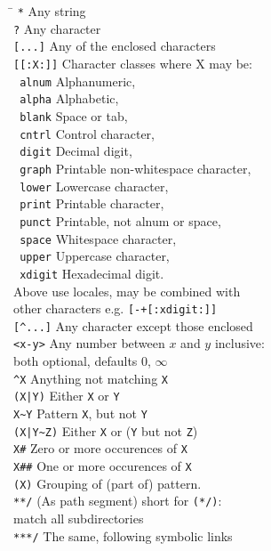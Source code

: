 \documentclass{article}
\begin{document}
\begin{multicols}{3}
\begin{tabbing}
\hskip 40pt \= \kill
\verb!*!       \>  Any string \\
\verb!?!       \>  Any character \\
\verb![...]!   \>  Any of the enclosed characters \\
\verb![[:X:]]! \>  Character classes where X may be: \\
\verb! alnum!  \>  Alphanumeric, \\
\verb! alpha!  \>  Alphabetic, \\
\verb! blank!  \>  Space or tab, \\
\verb! cntrl!  \>  Control character, \\
\verb! digit!  \>  Decimal digit, \\
\verb! graph!  \>  Printable non-whitespace character, \\
\verb! lower!  \>  Lowercase character, \\
\verb! print!  \>  Printable character, \\
\verb! punct!  \>  Printable, not alnum or space, \\
\verb! space!  \>  Whitespace character, \\
\verb! upper!  \>  Uppercase character, \\
\verb! xdigit! \>  Hexadecimal digit. \\
               \>  Above use locales, may be combined with \\
	       \>  other characters e.g. \verb![-+[:xdigit:]]! \\
\verb![^...]!  \>  Any character except those enclosed \\
\verb!<x-y>!   \>  Any number between $x$ and $y$ inclusive: \\
               \>  both optional, defaults $0$, $\infty$ \\
\verb!^X!      \>  Anything not matching \texttt{X} \\
\verb!(X|Y)!   \>  Either \texttt{X} or \texttt{Y} \\
\verb!X~Y!     \>  Pattern \texttt{X}, but not \texttt{Y} \\
\verb!(X|Y~Z)! \>  Either \texttt{X} or (\texttt{Y} but not \texttt{Z}) \\
\verb!X#!      \>  Zero or more occurences of \texttt{X} \\
\verb!X##!     \>  One or more occurences of \texttt{X} \\
\verb!(X)!     \>  Grouping of (part of) pattern. \\
\verb!**/!     \>  (As path segment) short for \verb!(*/)!: \\
               \> match all subdirectories \\
\verb!***/!    \>  The same, following symbolic links \\
\end{tabbing}


\end{multicols}
\end{document}
